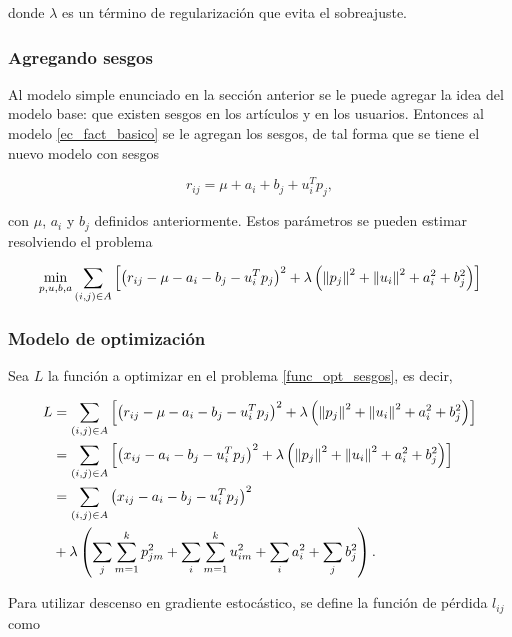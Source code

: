 donde $\lambda$ es un término de regularización que evita el sobreajuste.

\subsubsection{Agregando sesgos}

Al modelo simple enunciado en la sección anterior se le puede agregar la idea del modelo base: que existen sesgos en los artículos y en los usuarios. Entonces al modelo \ref{ec_fact_basico} se le agregan los sesgos, de tal forma que se tiene el nuevo modelo con sesgos

\begin{equation}\label{ec_fact_sesgo}
r_{ij} = \mu + a_i + b_j + u_i^T p_j,
\end{equation}

con $\mu$, $a_i$ y $b_j$ definidos anteriormente. Estos parámetros se pueden estimar resolviendo el problema

\begin{equation}\label{func_opt_sesgos}
\min_{p, u, b, a} \sum_{(i,j) \in A} \left [ \left( r_{ij} - \mu - a_i - b_j - u_i^T p_j \right) ^2 + \lambda \left( \left\lVert p_j \right\rVert^2 + \left\lVert u_i \right\rVert^2 + a_i^2 + b_j^2 \right) \right ]
\end{equation}

\subsubsection{Modelo de optimización}

Sea $L$ la función a optimizar en el problema \ref{func_opt_sesgos}, es decir,

\[
\begin{split}
L 
& = \sum_{(i,j) \in A} \left [ \left( r_{ij} - \mu - a_i - b_j - u_i^T p_j \right) ^2 + 
\lambda \left( \left\lVert p_j \right\rVert^2 + \left\lVert u_i \right\rVert^2 + a_i^2 + b_j^2 \right) \right ] \\
& = \sum_{(i,j) \in A} \left [ \left( x_{ij} - a_i - b_j - u_i^T p_j \right) ^2 + \lambda \left( \left\lVert p_j \right\rVert^2 + \left\lVert u_i \right\rVert^2 + a_i^2 + b_j^2 \right) \right ] \\
& = \sum_{(i,j) \in A} \left( x_{ij} - a_i - b_j - u_i^T p_j \right) ^2 \\
& + \lambda \left( 
\sum_j \sum_{m = 1}^{k}p_{jm}^2 + 
\sum_i \sum_{m = 1}^{k}u_{im}^2 + 
\sum_i a_i^2 + 
\sum_j b_j^2 \right) .
\end{split}
\]

Para utilizar descenso en gradiente estocástico, se define la función de pérdida $l_{ij}$ como

